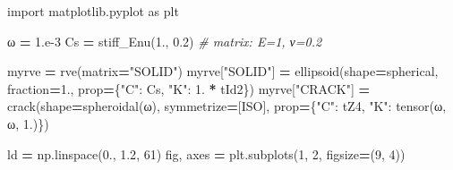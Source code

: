\documentclass[
  a4paper,
  numbers=noendperiod,
  DIV=12]{scrreprt}
\newenvironment{Shaded}{\begin{snugshade}}{\end{snugshade}}
\newcommand{\CommentTok}[1]{\textcolor[rgb]{0.56,0.35,0.01}{\textit{#1}}}
\newcommand{\DecValTok}[1]{\textcolor[rgb]{0.00,0.00,0.81}{#1}}
\newcommand{\FloatTok}[1]{\textcolor[rgb]{0.00,0.00,0.81}{#1}}
\newcommand{\ImportTok}[1]{#1}
\newcommand{\NormalTok}[1]{#1}
\newcommand{\OperatorTok}[1]{\textcolor[rgb]{0.81,0.36,0.00}{\textbf{#1}}}
\newcommand{\StringTok}[1]{\textcolor[rgb]{0.31,0.60,0.02}{#1}}
\begin{document}
\begin{Shaded}
\begin{Highlighting}[]
\ImportTok{import}\NormalTok{ matplotlib.pyplot }\ImportTok{as}\NormalTok{ plt}

\NormalTok{ω }\OperatorTok{=} \FloatTok{1.e{-}3}
\NormalTok{Cs }\OperatorTok{=}\NormalTok{ stiff\_Enu(}\FloatTok{1.}\NormalTok{, }\FloatTok{0.2}\NormalTok{)   }\CommentTok{\# matrix: E=1, ν=0.2}

\NormalTok{myrve }\OperatorTok{=}\NormalTok{ rve(matrix}\OperatorTok{=}\StringTok{"SOLID"}\NormalTok{)}
\NormalTok{myrve[}\StringTok{"SOLID"}\NormalTok{] }\OperatorTok{=}\NormalTok{ ellipsoid(shape}\OperatorTok{=}\NormalTok{spherical, fraction}\OperatorTok{=}\FloatTok{1.}\NormalTok{,}
\NormalTok{                            prop}\OperatorTok{=}\NormalTok{\{}\StringTok{"C"}\NormalTok{: Cs, }\StringTok{"K"}\NormalTok{: }\FloatTok{1.} \OperatorTok{*}\NormalTok{ tId2\})}
\NormalTok{myrve[}\StringTok{"CRACK"}\NormalTok{] }\OperatorTok{=}\NormalTok{ crack(shape}\OperatorTok{=}\NormalTok{spheroidal(ω), symmetrize}\OperatorTok{=}\NormalTok{[ISO],}
\NormalTok{                        prop}\OperatorTok{=}\NormalTok{\{}\StringTok{"C"}\NormalTok{: tZ4, }\StringTok{"K"}\NormalTok{: tensor(ω, ω, }\FloatTok{1.}\NormalTok{)\})}

\NormalTok{ld }\OperatorTok{=}\NormalTok{ np.linspace(}\FloatTok{0.}\NormalTok{, }\FloatTok{1.2}\NormalTok{, }\DecValTok{61}\NormalTok{)}
\NormalTok{fig, axes }\OperatorTok{=}\NormalTok{ plt.subplots(}\DecValTok{1}\NormalTok{, }\DecValTok{2}\NormalTok{, figsize}\OperatorTok{=}\NormalTok{(}\DecValTok{9}\NormalTok{, }\DecValTok{4}\NormalTok{))}


\end{Highlighting}
\end{Shaded}
\end{document}
